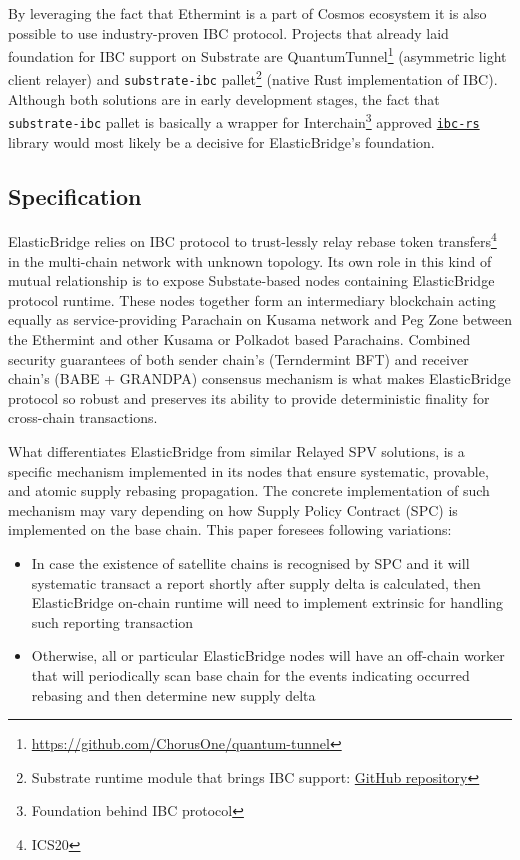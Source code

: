 \documentclass{article}
\begin{document}
By leveraging the fact that Ethermint is a part of Cosmos ecosystem it is also possible to use industry-proven IBC protocol. Projects that already laid foundation for IBC support on Substrate are QuantumTunnel\footnote{\url{https://github.com/ChorusOne/quantum-tunnel}} (asymmetric light client relayer) and \texttt{substrate-ibc} pallet\footnote{Substrate runtime module that brings IBC support: \href{https://github.com/octopus-network/substrate-ibc}{GitHub repository}} (native Rust implementation of IBC). Although both solutions are in early development stages, the fact that \texttt{substrate-ibc} pallet is basically a wrapper for Interchain\footnote{Foundation behind IBC protocol} approved \texttt{\href{https://github.com/informalsystems/ibc-rs}{ibc-rs}} library would most likely be a decisive for ElasticBridge's foundation.

\subsection{Specification}

ElasticBridge relies on IBC protocol to trust-lessly relay rebase token transfers\footnote{ICS20} in the multi-chain network with unknown topology. Its own role in this kind of mutual relationship is to expose Substate-based nodes containing ElasticBridge protocol runtime. These nodes together form an intermediary blockchain acting equally as service-providing Parachain on Kusama network and Peg Zone between the Ethermint and other Kusama or Polkadot based Parachains. Combined security guarantees of both sender chain's (Terndermint BFT) and receiver chain's (BABE + GRANDPA) consensus mechanism is what makes ElasticBridge protocol so robust and preserves its ability to provide deterministic finality for cross-chain transactions.

What differentiates ElasticBridge from similar Relayed SPV solutions, is a specific mechanism implemented in its nodes that ensure systematic, provable, and atomic supply rebasing propagation. The concrete implementation of such mechanism may vary depending on how Supply Policy Contract (SPC) is implemented on the base chain. This paper foresees following variations:

\begin{itemize}%
  \renewcommand{\labelitemi}{$\Rightarrow$}
	\item In case the existence of satellite chains is recognised by SPC and it will systematic transact a report shortly after supply delta is calculated, then ElasticBridge on-chain runtime will need to implement extrinsic for handling such reporting transaction
	\item Otherwise, all or particular ElasticBridge nodes will have an off-chain worker that will periodically scan base chain for the events indicating occurred rebasing and then determine new supply delta 
\end{itemize}
\end{document}
